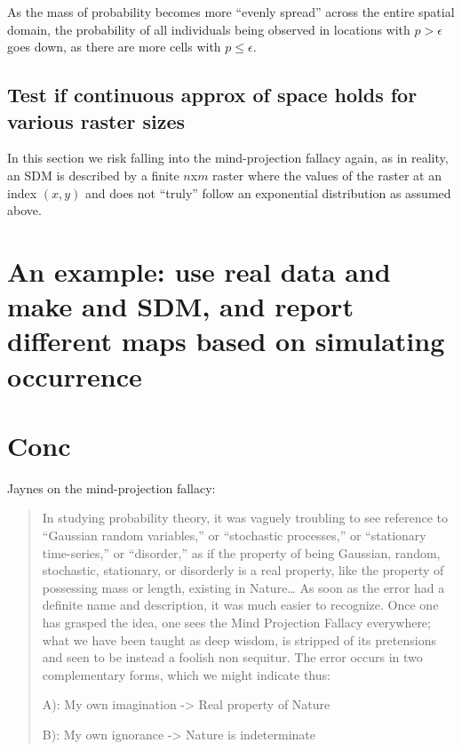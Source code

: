 \documentclass[11pt]{article}
\begin{document}
As the mass of probability becomes more ``evenly spread'' across the
entire spatial domain, the probability of all individuals being observed
in locations with \(p > \epsilon\) goes down, as there are more cells
with \(p \leq \epsilon\).

\hypertarget{test-if-continuous-approx-of-space-holds-for-various-raster-sizes}{%
\subsection{Test if continuous approx of space holds for various raster
sizes}\label{test-if-continuous-approx-of-space-holds-for-various-raster-sizes}}

In this section we risk falling into the mind-projection fallacy again,
as in reality, an SDM is described by a finite \(n\)x\(m\) raster where
the values of the raster at an index \((x,y)\) and does not ``truly''
follow an exponential distribution as assumed above.

\hypertarget{an-example-use-real-data-and-make-and-sdm-and-report-different-maps-based-on-simulating-occurrence}{%
\section{An example: use real data and make and SDM, and report
different maps based on simulating
occurrence}\label{an-example-use-real-data-and-make-and-sdm-and-report-different-maps-based-on-simulating-occurrence}}

\hypertarget{conc}{%
\section{Conc}\label{conc}}

Jaynes on the mind-projection fallacy:

\begin{quote}
In studying probability theory, it was vaguely troubling to see
reference to ``Gaussian random variables,'' or ``stochastic processes,''
or ``stationary time-series,'' or ``disorder,'' as if the property of
being Gaussian, random, stochastic, stationary, or disorderly is a real
property, like the property of possessing mass or length, existing in
Nature\ldots{} As soon as the error had a definite name and description,
it was much easier to recognize. Once one has grasped the idea, one sees
the Mind Projection Fallacy everywhere; what we have been taught as deep
wisdom, is stripped of its pretensions and seen to be instead a foolish
non sequitur. The error occurs in two complementary forms, which we
might indicate thus:

A): My own imagination -\textgreater{} Real property of Nature

B): My own ignorance -\textgreater{} Nature is indeterminate
\end{quote}
\end{document}
